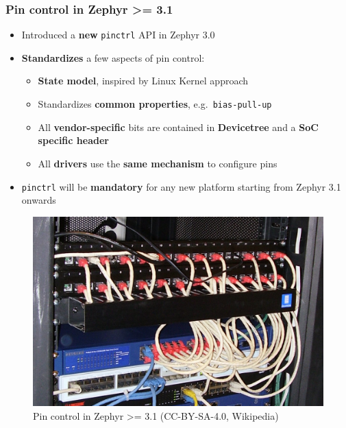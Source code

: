 \documentclass[handout]{beamer}
\begin{document}
\begin{frame}
  \frametitle{Pin control in Zephyr >= 3.1}

  \begin{itemize}
    \item<1-> Introduced a \textbf{new} \texttt{pinctrl} API in Zephyr 3.0
    \item<2-> \textbf{Standardizes} a few aspects of pin control:
          \begin{itemize}
            \item \textbf{State model}, inspired by Linux Kernel approach
            \item Standardizes \textbf{common properties},
                  e.g.\ \texttt{bias-pull-up}
            \item All \textbf{vendor-specific} bits are contained in
                  \textbf{Devicetree} and a \textbf{SoC specific header}
            \item All \textbf{drivers} use the \textbf{same mechanism} to
                  configure pins
          \end{itemize}
    \item<3-> \texttt{pinctrl} will be \textbf{mandatory} for any new platform
          starting from Zephyr 3.1 onwards
  \end{itemize}

  \begin{figure}
    \centering
    \includegraphics[scale=0.1]{cable-tidy.jpg}
    \caption{Pin control in Zephyr >= 3.1 (CC-BY-SA-4.0, Wikipedia)}
  \end{figure}
\end{frame}

\end{document}
